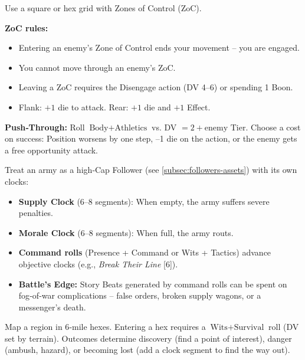 \begin{tcolorbox}[title=Grid‑Based Combat (Optional), colback=white!97!gray, colframe=black!80!gray]
Use a square or hex grid with Zones of Control (ZoC).

\textbf{ZoC rules:}
\begin{itemize}
  \item Entering an enemy’s Zone of Control ends your movement – you are engaged.
  \item You cannot move through an enemy’s ZoC.
  \item Leaving a ZoC requires the Disengage action (DV 4–6) or spending 1 Boon.
  \item Flank: \(+1\) die to attack. Rear: \(+1\) die and \(+1\) Effect.
\end{itemize}
\textbf{Push‑Through:} Roll $\text{Body}+\text{Athletics}$ vs. DV $= 2 + \text{enemy Tier}$. Choose a cost on success: Position worsens by one step, –1 die on the action, or the enemy gets a free opportunity attack.
\end{tcolorbox}

\begin{tcolorbox}[title=Detailed Warfare (Mass Combat), colback=white!97!gray, colframe=black!80!gray]
Treat an army as a high‑Cap Follower (see \ref{subsec:followers-assets}) with its own clocks:
\begin{itemize}
  \item \textbf{Supply Clock} (6–8 segments): When empty, the army suffers severe penalties.
  \item \textbf{Morale Clock} (6–8 segments): When full, the army routs.
  \item \textbf{Command rolls} (Presence + Command or Wits + Tactics) advance objective clocks (e.g., \emph{Break Their Line} [6]).
  \item \textbf{Battle’s Edge:} Story Beats generated by command rolls can be spent on fog‑of‑war complications – false orders, broken supply wagons, or a messenger’s death.
\end{itemize}
\end{tcolorbox}

\begin{tcolorbox}[title=Hex‑Based Exploration, colback=white!97!gray, colframe=black!80!gray]
Map a region in 6‑mile hexes. Entering a hex requires a $\text{Wits}+\text{Survival}$ roll (DV set by terrain). Outcomes determine discovery (find a point of interest), danger (ambush, hazard), or becoming lost (add a clock segment to find the way out).
\end{tcolorbox}

